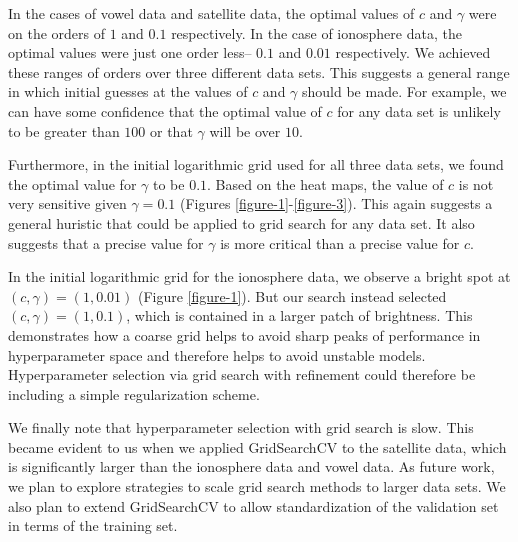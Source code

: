 \documentclass[12pt]{article}
\begin{document}
In the cases of vowel data and satellite data, the optimal values of $c$ and $\gamma$ were on the orders of $1$ and $0.1$ respectively. In the case of ionosphere data, the optimal values were just one order less-- $0.1$ and $0.01$ respectively. We achieved these ranges of orders over three different data sets. This suggests a general range in which initial guesses at the values of $c$ and $\gamma$ should be made. For example, we can have some confidence that the optimal value of $c$ for any data set is unlikely to be greater than $100$ or that $\gamma$ will be over $10$.

Furthermore, in the initial logarithmic grid used for all three data sets, we found the optimal value for $\gamma$ to be $0.1$. Based on the heat maps, the value of $c$ is not very sensitive given $\gamma=0.1$ (Figures \ref{figure-1}-\ref{figure-3}). This again suggests a general huristic that could be applied to grid search for any data set. It also suggests that a precise value for $\gamma$ is more critical than a precise value for $c$.

In the initial logarithmic grid for the ionosphere data, we observe a bright spot at $(c, \gamma) = (1, 0.01)$ (Figure \ref{figure-1}). But our search instead selected $(c, \gamma) = (1, 0.1)$, which is contained in a larger patch of brightness. This demonstrates how a coarse grid helps to avoid sharp peaks of performance in hyperparameter space and therefore helps to avoid unstable models. Hyperparameter selection via grid search with refinement could therefore be including a simple regularization scheme.

We finally note that hyperparameter selection with grid search is slow. This became evident to us when we applied GridSearchCV to the satellite data, which is significantly larger than the ionosphere data and vowel data. As future work, we plan to explore strategies to scale grid search methods to larger data sets. We also plan to extend GridSearchCV to allow standardization of the validation set in terms of the training set.
\end{document}
